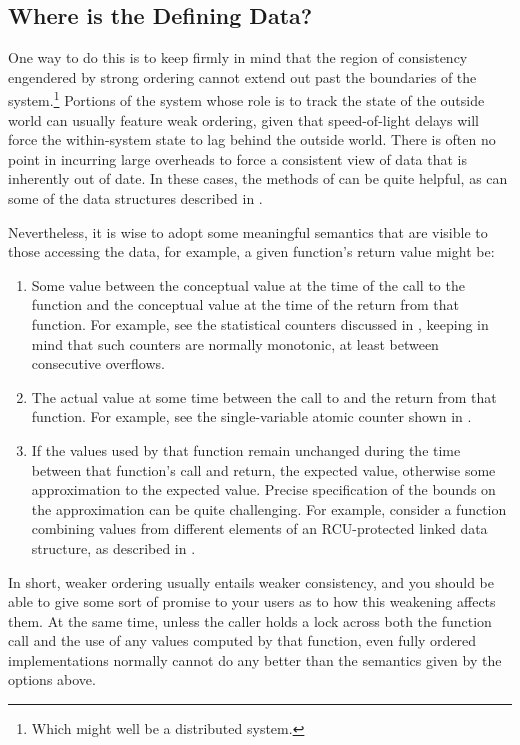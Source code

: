 \subsection{Where is the Defining Data?}
\label{sec:app:questions:Where is the Defining Data?}

One way to do this is to keep firmly in mind that the region of
consistency engendered by strong ordering cannot extend out past the
boundaries of the system.\footnote{
	Which might well be a distributed system.}
Portions of the system whose role is to track the state of the outside
world can usually feature weak ordering, given that speed-of-light delays
will force the within-system state to lag behind the outside world.
There is often no point in incurring large overheads to force a consistent
view of data that is inherently out of date.
In these cases, the methods of  can be
quite helpful, as can some of the data structures described in
.

Nevertheless, it is wise to adopt some meaningful semantics that are
visible to those accessing the data, for example, a given function's
return value might be:

\begin{enumerate}
\item	Some value between the conceptual value at the time of the call
	to the function and the conceptual value at the time of the
	return from that function.
	For example, see the statistical counters discussed in
	, keeping in mind that such
	counters are normally monotonic, at least between consecutive
	overflows.
\item	The actual value at some time between the call to and the return
	from that function.
	For example, see the single-variable atomic counter shown in
	.
\item	If the values used by that function remain unchanged during the
	time between that function's call and return, the expected
	value, otherwise some approximation to the expected value.
	Precise specification of the bounds on the approximation can
	be quite challenging.
	For example, consider a function combining values from
	different elements of an RCU-protected linked data structure,
	as described in .
\end{enumerate}

In short, weaker ordering usually entails weaker consistency, and
you should be able to give some sort of promise to your users as
to how this weakening affects them.
At the same time, unless the caller holds a lock across both the
function call and the use of any values computed by that function,
even fully ordered implementations normally cannot do any better
than the semantics given by the options above.

